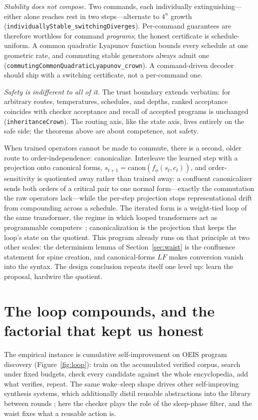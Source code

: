 \documentclass[11pt]{article}
\newcommand{\code}[1]{\texttt{#1}}
\begin{document}
\emph{Stability does not compose.} Two commands, each individually
extinguishing---either alone reaches rest in two steps---alternate to $4^{n}$ growth
(\code{individuallyStable\_switchingDiverges}). Per-command guarantees are therefore
worthless for command \emph{programs}; the honest certificate is schedule-uniform. A
common quadratic Lyapunov function bounds every schedule at one geometric rate, and
commuting stable generators always admit one
(\code{commutingCommonQuadraticLyapunov\_crown}). A command-driven decoder should ship
with a switching certificate, not a per-command one.

\emph{Safety is indifferent to all of it.} The trust boundary extends verbatim: for
arbitrary routes, temperatures, schedules, and depths, ranked acceptance coincides with
checker acceptance and recall of accepted programs is unchanged
(\code{inheritanceCrown}). The routing axis, like the state axis, lives entirely on the
safe side; the theorems above are about competence, not safety.

When trained operators cannot be made to commute, there is a second, older route to
order-independence: canonicalize. Interleave the learned step with a projection onto
canonical forms, $s_{t+1} = \mathrm{canon}(f_{\phi}(s_t, c_t))$, and order-sensitivity
is quotiented away rather than trained away: a confluent canonicalizer sends both
orders of a critical pair to one normal form---exactly the commutation the raw
operators lack---while the per-step projection stops representational drift from
compounding across a schedule. The iterated form is a weight-tied loop of the same
transformer, the regime in which looped transformers act as programmable
computers~\cite{giannou2023}; canonicalization is the projection that keeps the loop's
state on the quotient. This program already runs on that principle at two other
scales: the determinism lemma of Section~\ref{sec:waist} is the confluence statement
for spine creation, and canonical-forms $LF$ makes conversion vanish into the syntax.
The design conclusion repeats itself one level up: learn the proposal, hardwire the
quotient.

\section{The loop compounds, and the factorial that kept us honest}
\label{sec:experiments}

The empirical instance is cumulative self-improvement on OEIS program discovery
\cite{gauthier2023} (Figure~\ref{fig:loop}): train on the accumulated verified corpus,
search under fixed budgets, check every candidate against the whole encyclopedia, add
what verifies, repeat. The same wake--sleep shape drives other self-improving synthesis
systems, which additionally distil reusable abstractions into the library between rounds
\cite{ellis2021}; here the checker plays the role of the sleep-phase filter, and the
waist fixes what a reusable action is.
\end{document}
